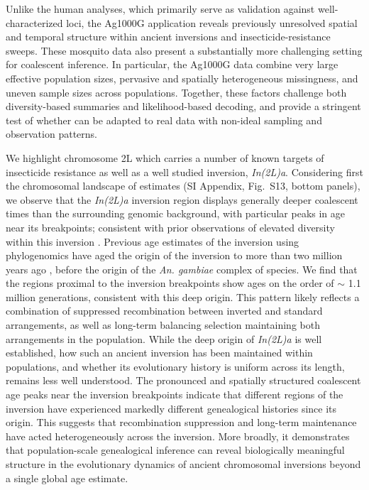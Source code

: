 \documentclass[9pt,twocolumn,twoside]{pnas-new}
\begin{document}
Unlike the human analyses, which primarily serve as validation against well-characterized loci, 
the Ag1000G application reveals previously unresolved spatial and temporal structure within ancient inversions and insecticide-resistance sweeps.
These mosquito data also present a substantially more challenging setting for coalescent inference.
In particular,
the Ag1000G data combine very large effective population sizes,
pervasive and spatially heterogeneous missingness,
and uneven sample sizes across populations.
Together,
these factors challenge both diversity-based summaries and likelihood-based decoding,
and provide a stringent test of whether \cxtkit can be adapted to real data 
with non-ideal sampling and observation patterns.

We highlight chromosome 2L which carries a number of known targets
of insecticide resistance as well as a well studied inversion, \emph{In(2L)a}. 
Considering first the chromosomal landscape of estimates (SI Appendix, Fig.~S13,
bottom panels), we observe that the \emph{In(2L)a} inversion region displays generally deeper coalescent times
than the surrounding genomic background, with particular peaks in age near its breakpoints;
consistent with prior observations of elevated diversity within this inversion \cite{love2016chromosomal}. 
Previous age estimates of the inversion using phylogenomics have aged the origin of the
inversion to more than two million years ago \cite{fontaine2015extensive},
before the origin of the \emph{An. gambiae} complex of species.
We find that the regions proximal to the inversion breakpoints show ages on the order of $\sim$ 1.1 million generations, consistent with this deep origin.
This pattern likely reflects a combination of suppressed recombination between inverted and standard arrangements, 
as well as long-term balancing selection maintaining both arrangements in the population.
While the deep origin of \emph{In(2L)a} is well established, how such an ancient inversion has been maintained within populations, and whether its evolutionary history is uniform across its length, remains less well understood. The pronounced and spatially structured coalescent age peaks near the inversion breakpoints indicate that different regions of the inversion have experienced markedly different genealogical histories since its origin. 
This suggests that recombination suppression and long-term maintenance have acted heterogeneously across the inversion.
More broadly, it demonstrates that population-scale genealogical inference can reveal biologically meaningful structure in the evolutionary dynamics of ancient chromosomal inversions beyond a single global age estimate.
\end{document}
